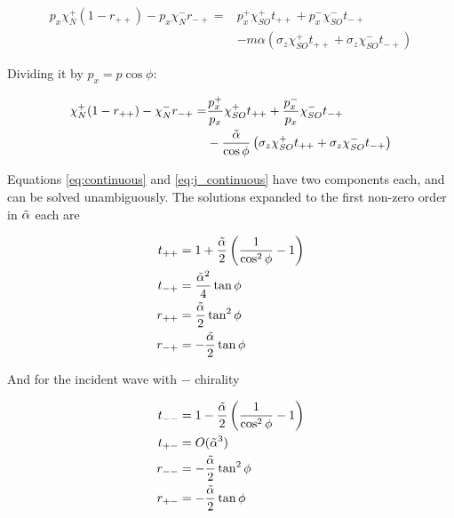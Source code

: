 \begin{align}
    p_x \chi_N^+ (1 - r_{++}) - p_x \chi_N^- r_{-+}
        =& p_x^+ \chi_{SO}^+ t_{++} + p_x^- \chi_{SO}^- t_{-+} \nonumber\\
         &   - m \alpha \left(  \sigma_z \chi_{SO}^+ t_{++}
                            + \sigma_z \chi_{SO}^- t_{-+} \right)
\end{align}

Dividing it by  $p_x = p \cos \phi$: 

\begin{align}
    \chi_N^+ (1 - r_{++}) - \chi_N^- r_{-+}
        =& \frac{p_x^+}{p_x} \chi_{SO}^+ t_{++} + \frac{p_x^-}{p_x} \chi_{SO}^- t_{-+} \nonumber\\
         &   - \frac{\tilde \alpha}{\cos \phi} \left(\sigma_z \chi_{SO}^+
                 t_{++} + \sigma_z \chi_{SO}^- t_{-+} \right)
                                \label{eq:j_continuous}
\end{align}

Equations \ref{eq:continuous} and \ref{eq:j_continuous} have two
components each, and can be solved unambiguously. 
The solutions expanded to the first non-zero order in $\tilde \alpha$ each are

\begin{align}
    t_{++} &= 1 +
            \frac{\tilde \alpha}{2}\left( \frac{1}{\cos^2\phi} - 1 \right)\\
    t_{-+} &= \frac{\tilde \alpha^2}{4}\tan \phi \\
    r_{++} &= \frac{\tilde \alpha}{2} \tan^2 \phi\\
    r_{-+} &= -\frac{\tilde \alpha}{2} \tan \phi
\end{align}

And for the incident wave with $-$ chirality

\begin{align}
    t_{--} &= 1 - \frac{\tilde \alpha}{2} \left( \frac{1}{\cos^2\phi} - 1 \right)\\
    t_{+-} &= O(\tilde \alpha^3)\\
    r_{--} &= -\frac{\tilde \alpha}{2} \tan^2 \phi\\
    r_{+-} &= -\frac{\tilde \alpha}{2} \tan \phi
\end{align}

